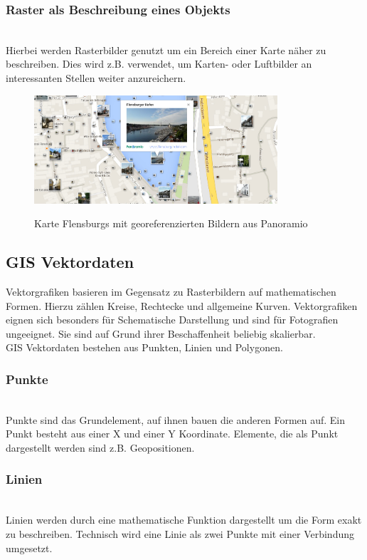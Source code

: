 \documentclass[10pt,conference,compsocconf]{IEEEtran}
\begin{document}
\subsubsection{Raster als Beschreibung eines Objekts}\hspace*{\fill} \\
Hierbei werden Rasterbilder genutzt um ein Bereich einer Karte näher zu beschreiben. Dies wird z.B. verwendet, um Karten- oder Luftbilder an interessanten Stellen weiter anzureichern. 

\begin{figure}[H]
  \centering
  	\includegraphics[height=114pt]{img/gis_beschreibung_object}\\
  \caption[]{Karte Flensburgs mit georeferenzierten Bildern aus Panoramio\footnotemark}
  \label{img:gis_beschreibung_object}
\end{figure}

\subsection{GIS Vektordaten}
Vektorgrafiken basieren im Gegensatz zu Rasterbildern auf mathematischen Formen. Hierzu zählen Kreise, Rechtecke und allgemeine Kurven. Vektorgrafiken eignen sich besonders für Schematische Darstellung und sind für Fotografien ungeeignet. Sie sind auf Grund ihrer Beschaffenheit beliebig skalierbar.\\
GIS Vektordaten bestehen aus Punkten, Linien und Polygonen.

\subsubsection{Punkte}\hspace*{\fill} \\
Punkte sind das Grundelement, auf ihnen bauen die anderen Formen auf. Ein Punkt besteht aus einer X und einer Y Koordinate. Elemente, die als Punkt dargestellt werden sind z.B. Geopositionen.

\subsubsection{Linien}\hspace*{\fill} \\
Linien werden durch eine mathematische Funktion dargestellt um die Form exakt zu beschreiben. Technisch wird eine Linie als zwei Punkte mit einer Verbindung umgesetzt.
\end{document}
